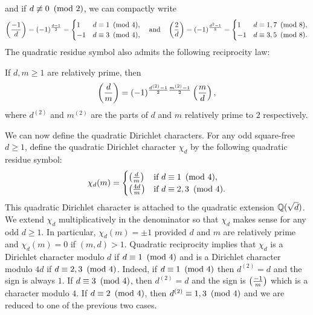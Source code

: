 \documentclass[12pt,reqno,oneside]{amsart}
\begin{document}
    and if $d \not\equiv 0 \ \left(\text{mod }2\right)$, we can compactly write
    \[
        \left(\frac{-1}{d}\right) = (-1)^{\frac{d-1}{2}} = \begin{cases} 1 & \text{$d \equiv 1 \ \left(\text{mod }4\right)$}, \\ -1 & \text{$d \equiv 3 \ \left(\text{mod }4\right)$}, \end{cases} \quad \text{and} \quad \left(\frac{2}{d}\right) = (-1)^{\frac{d^{2}-1}{8}} = \begin{cases} 1 & \text{$d \equiv 1,7 \ \left(\text{mod }8\right)$}, \\ -1 & \text{$d \equiv 3,5 \ \left(\text{mod }8\right)$}. \end{cases}
    \]
     The quadratic residue symbol also admits the following reciprocity law:

    \begin{theorem}
        If $d,m \ge 1$ are relatively prime, then
        \[
            \left(\frac{d}{m}\right) = (-1)^{\frac{d^{(2)}-1}{2}\frac{m^{(2)}-1}{2}}\left(\frac{m}{d}\right),
        \]
        where $d^{(2)}$ and $m^{(2)}$ are the parts of $d$ and $m$ relatively prime to $2$ respectively.
    \end{theorem}

    We can now define the quadratic Dirichlet characters. For any odd square-free $d \ge 1$, define the quadratic Dirichlet character $\chi_{d}$ by the following quadratic residue symbol:
    \[
        \chi_{d}(m) = \begin{cases} \left(\frac{d}{m}\right) & \text{if $d \equiv 1 \ \left(\text{mod }4\right)$}, \\ \left(\frac{4d}{m}\right) & \text{if $d \equiv 2,3 \ \left(\text{mod }4\right)$}. \end{cases}
    \]
    This quadratic Dirichlet character is attached to the quadratic extension $\mathbb{Q}(\sqrt{d})$. We extend $\chi_{d}$ multiplicatively in the denominator so that $\chi_{d}$ makes sense for any odd $d \ge 1$. In particular, $\chi_{d}(m) = \pm1$ provided $d$ and $m$ are relatively prime and $\chi_{d}(m) = 0$ if $(m,d) > 1$. Quadratic reciprocity implies that $\chi_{d}$ is a Dirichlet character modulo $d$ if $d \equiv 1 \ \left(\text{mod }4\right)$ and is a Dirichlet character modulo $4d$ if $d \equiv 2,3 \ \left(\text{mod }4\right)$. Indeed, if $d \equiv 1 \ \left(\text{mod }4\right)$ then $d^{(2)} = d$ and the sign is always $1$. If $d \equiv 3 \ \left(\text{mod }4\right)$, then $d^{(2)} = d$ and the sign is $\textstyle{\left(\frac{-1}{m}\right)}$ which is a character modulo $4$. If $d \equiv 2 \ \left(\text{mod }4\right)$, then $d^{(2)} \equiv 1,3 \ \left(\text{mod }4\right)$ and we are reduced to one of the previous two cases.
\end{document}

